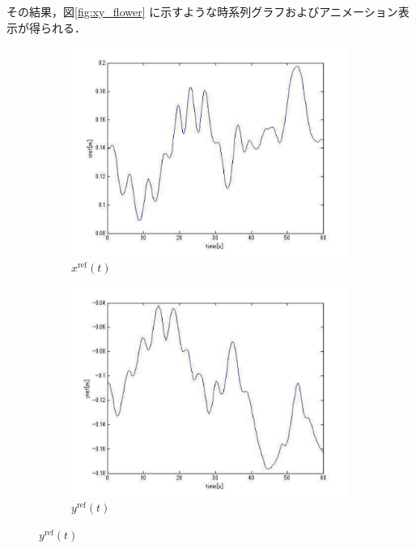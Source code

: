 その結果，図\ref{fig:xy_flower} に示すような時系列グラフおよびアニメーション表示が得られる．

\begin{figure}[H]
    \centering
    \begin{subfigure}[b]{0.45\linewidth}
        \centering
        \includegraphics[width=\linewidth]{figure/xref.pdf}
        \caption{$x^{\mathrm{ref}}(t)$}
    \end{subfigure}
    \begin{subfigure}[b]{0.45\linewidth}
        \centering
        \includegraphics[width=\linewidth]{figure/yref.pdf}
        \caption{$y^{\mathrm{ref}}(t)$}
    \end{subfigure}


\end{figure}
